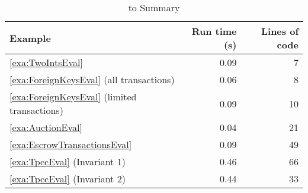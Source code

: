 \begin{table}[t]
  \centering
  \caption{ to  Summary}%
  \begin{tabular}{lrr}
    \toprule
    Example                                          & Run time (s) & Lines of code \\\midrule
    \ref{exa:TwoIntsEval}                            & 0.09         & 7 \\
    \ref{exa:ForeignKeysEval} (all transactions)     & 0.06         & 8 \\
    \ref{exa:ForeignKeysEval} (limited transactions) & 0.09         & 10 \\
    \ref{exa:AuctionEval}                            & 0.04         & 21 \\
    \ref{exa:EscrowTransactionsEval}                 & 0.09         & 49 \\
    \ref{exa:TpccEval} (Invariant 1)                 & 0.46         & 66 \\
    \ref{exa:TpccEval} (Invariant 2)                 & 0.44         & 33 \\
    \bottomrule
  \end{tabular}
\end{table}
